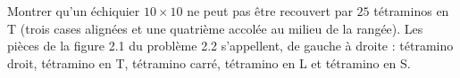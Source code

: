 Montrer qu'un échiquier $10 \times 10$ ne peut pas être recouvert par $25$ tétraminos en T (trois cases alignées et une quatrième accolée au milieu de la rangée). Les pièces de la figure 2.1 du problème 2.2 s'appellent, de gauche à droite : tétramino droit, tétramino en T, tétramino carré, tétramino en L et tétramino en S.
